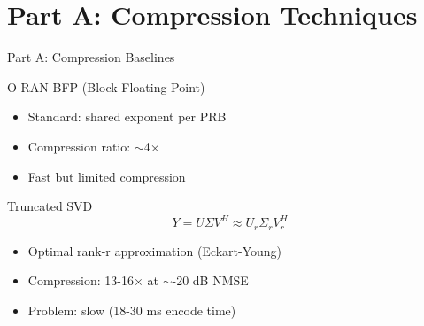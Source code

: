\documentclass[aspectratio=169]{beamer}
\begin{document}
\section{Part A: Compression Techniques}

\begin{frame}{Part A: Compression Baselines}
\begin{block}{O-RAN BFP (Block Floating Point)}
\begin{itemize}
    \item Standard: shared exponent per PRB
    \item Compression ratio: $\sim$4×
    \item Fast but limited compression
\end{itemize}
\end{block}

\begin{block}{Truncated SVD}
\begin{equation*}
Y = U\Sigma V^H \approx U_r \Sigma_r V_r^H
\end{equation*}
\begin{itemize}
    \item Optimal rank-r approximation (Eckart-Young)
    \item Compression: 13-16× at $\sim$-20 dB NMSE
    \item Problem: slow (18-30 ms encode time)
\end{itemize}
\end{block}
\end{frame}
\end{document}
